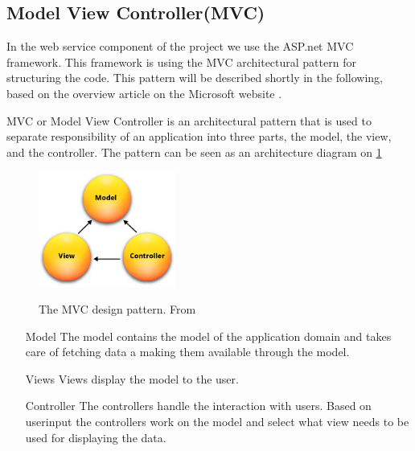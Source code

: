 \subsection{Model View Controller(MVC)}
In the web service component of the project we use the ASP.net MVC framework. 
This framework is using the MVC architectural pattern for structuring the code.
This pattern will be described shortly in the following, based on the overview article on the Microsoft website \citet{aspmvc}.

MVC or Model View Controller is an architectural pattern that is used to separate responsibility of an application into three parts, the model, the view, and the controller.
The pattern can be seen as an architecture diagram on \cref{mvcdiagram}

\begin{figure}[h]
\center
\includegraphics[width=0.4\textwidth]{graphics/mvc}
\label{mvcdiagram}
\caption{The MVC design pattern. From \cite{aspmvc}}
\end{figure}

\begin{itemize}
\item[Model] The model contains the model of the application domain and takes care of fetching data a making them available through the model.
\item[Views] Views display the model to the user.
\item[Controller] The controllers handle the interaction with users. Based on userinput the controllers work on the model and select what view needs to be used for displaying the data.
\end{itemize}